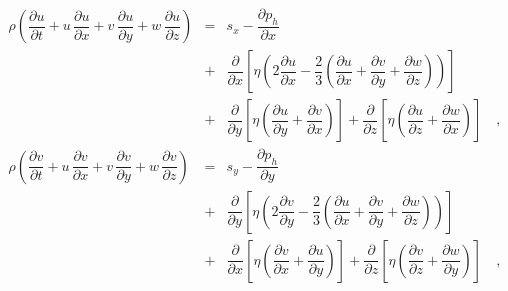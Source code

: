 \begin{eqnarray}\label{gl:mehrzeilige_gleichung}
  \rho \left( \dfrac{\partial u}{\partial t} + u\, \dfrac{\partial u}{\partial x}
                                             + v\, \dfrac{\partial u}{\partial y}
                                             + w\, \dfrac{\partial u}{\partial z} \right)
  & = & s_x - \dfrac{\partial p_h}{\partial x} \nonumber \\
  & + & \dfrac{\partial}{\partial x} \left[ \eta \left( 2 \dfrac{\partial u}{\partial x}
                                                        - \dfrac{2}{3} \left( \dfrac{\partial u}{\partial x}
                                                                            + \dfrac{\partial v}{\partial y}
                                                                            + \dfrac{\partial w}{\partial z}\right) \right) \right] \nonumber \\
  & + & \dfrac{\partial}{\partial y} \left[ \eta \left( \dfrac{\partial u}{\partial y}
                                                      + \dfrac{\partial v}{\partial x} \right) \right]
      + \dfrac{\partial}{\partial z} \left[ \eta \left( \dfrac{\partial u}{\partial z}
                                                      + \dfrac{\partial w}{\partial x} \right) \right]\quad, \nonumber \\
  \rho \left( \dfrac{\partial v}{\partial t} + u\, \dfrac{\partial v}{\partial x}
                                             + v\, \dfrac{\partial v}{\partial y}
                                             + w\, \dfrac{\partial v}{\partial z} \right)
  & = & s_y - \dfrac{\partial p_h}{\partial y} \\
  & + & \dfrac{\partial}{\partial y} \left[ \eta \left( 2 \dfrac{\partial v}{\partial y}
                                                        - \dfrac{2}{3} \left( \dfrac{\partial u}{\partial x}
                                                                            + \dfrac{\partial v}{\partial y}
                                                                            + \dfrac{\partial w}{\partial z}\right) \right) \right] \nonumber \\
  & + & \dfrac{\partial}{\partial x} \left[ \eta \left( \dfrac{\partial v}{\partial x}
                                                      + \dfrac{\partial u}{\partial y} \right) \right]
      + \dfrac{\partial}{\partial z} \left[ \eta \left( \dfrac{\partial v}{\partial z}
                                                      + \dfrac{\partial w}{\partial y} \right) \right]\quad, \nonumber \\

\end{eqnarray}
